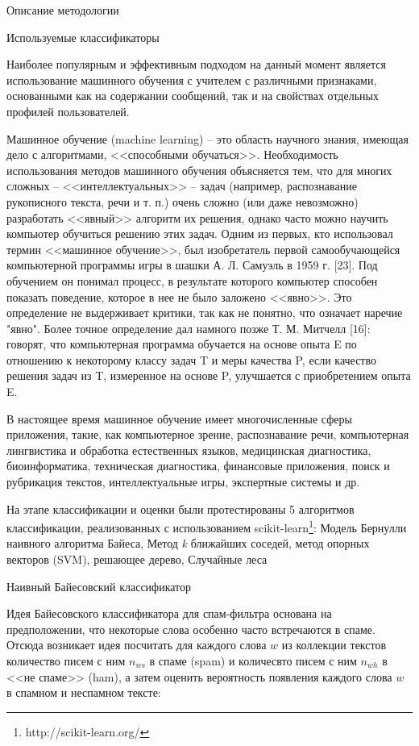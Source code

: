 \begin{section}{Описание методологии}
  \begin{subsection}{Используемые классификаторы}

    Наиболее популярным и эффективным подходом на данный момент является использование машинного обучения с учителем с различными признаками, основанными как на содержании сообщений, так и на свойствах отдельных профилей пользователей.

    Машинное обучение (machine learning) – это область научного знания, имеющая дело с алгоритмами, <<способными обучаться>>. Необходимость использования методов машинного обучения объясняется тем, что для многих сложных – <<интеллектуальных>> – задач (например, распознавание рукописного текста, речи и т. п.) очень сложно (или даже невозможно) разработать <<явный>> алгоритм их решения, однако часто можно научить компьютер обучиться решению этих задач. Одним из первых, кто использовал термин <<машинное обучение>>, был изобретатель первой самообучающейся компьютерной программы игры в шашки А. Л. Самуэль в 1959 г. [23]. Под обучением он понимал процесс, в результате которого компьютер способен показать поведение, которое в нее не было заложено <<явно>>. Это определение не выдерживает критики, так как не понятно, что означает наречие "явно". Более точное определение дал намного позже Т. М. Митчелл [16]: говорят, что компьютерная программа обучается на основе опыта E по отношению к некоторому классу задач T и меры качества P, если качество решения задач из T, измеренное на основе P, улучшается с приобретением опыта E.

    В настоящее время машинное обучение имеет многочисленные сферы приложения, такие, как компьютерное зрение, распознавание речи, компьютерная лингвистика и обработка естественных языков, медицинская диагностика, биоинформатика, техническая диагностика, финансовые приложения, поиск и рубрикация текстов, интеллектуальные игры, экспертные системы и др.


    На этапе классификации и оценки были протестированы 5 алгоритмов классификации, реализованных с использованием scikit-learn\footnote{http://scikit-learn.org/}: Модель Бернулли наивного алгоритма Байеса,
    Метод \textit{k} ближайших соседей, метод опорных векторов (SVM), решающее дерево, Случайные леса

    \begin{subsubsection}{Наивный Байесовский классификатор}

Идея Байесовского классификатора для спам-фильтра основана на предположении,
что некоторые слова особенно часто встречаются в спаме. Отсюда возникает идея посчитать для каждого слова $w$ из коллекции текстов количество писем с ним $n_{ws}$
в спаме (spam) и количесвто писем с ним $n_{wh}$ в <<не спаме>> (ham), а затем оценить вероятность появления каждого слова $w$ в спамном и неспамном тексте:


\end{subsubsection}
\end{subsection}
\end{section}
